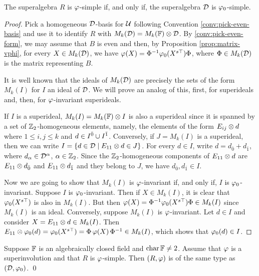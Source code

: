 \begin{prop}\label{prop:vphi-R-simple-D-simple}
	The superalgebra $R$ is $\varphi$-simple if, and only if, the superalgebra $\mathcal{D}$ is $\varphi_0$-simple.
\end{prop}

\begin{proof}
	Pick a homogeneous $\mathcal{D}$-basis for $\mathcal U$ following Convention \ref{conv:pick-even-basis} and use it to identify $R$ with $M_k(\mathcal{D}) = M_k(\mathbb{F}) \otimes \mathcal{D}$.
	By \cref{conv:pick-even-form}, we may assume that $B$ is even and then,
	by Proposition \ref{prop:matrix-vphi}, for every $X \in M_k(\mathcal{D})$, we have
	$\varphi(X) = \Phi^{-1} \varphi_0(X^{s\top}) \Phi$, where $\Phi \in M_k(\mathcal{D})$ is the matrix representing $B$. 

	It is well known that the ideals of $M_k(\mathcal{D})$ are precisely the sets of the form $M_k(I)$ for $I$ an ideal of $\mathcal{D}$.
	We will prove an analog of this, first, for superideals and, then, for $\varphi$-invariant superideals.

	If $I$ is a superideal, $M_k(I) = M_k(\mathbb{F}) \otimes I$ is also a superideal since it is spanned by a set of $\mathbb{Z}_2$-homogeneous elements, namely, the elements of the form $E_{ij}\otimes d$ where $1 \leq i,j \leq k$ and $d \in I^{\bar0} \cup I^{\bar1}$.
	Conversely, if $J = M_k(I)$ is a superideal, then we can write $I = \{ d\in  \mathcal{D} \mid E_{11}\otimes d \in J\}$.
	For every $d\in I$, write $d = d_{\bar 0} + d_{\bar 1}$, where $d_\alpha \in \mathcal{D}^\alpha$, $\alpha \in \mathbb{Z}_2$.
	Since the $\mathbb{Z}_2$-homogeneous components of $E_{11}\otimes d$ are $E_{11}\otimes d_{\bar 0}$ and $E_{11}\otimes d_{\bar 1}$ and they belong to $J$, we have $d_{\bar 0}, d_{\bar 1} \in I$.

	Now we are going to show that $M_k(I)$ is $\varphi$-invariant if, and only if, $I$ is $\varphi_0$-invariant.
	Suppose $I$ is $\varphi_0$-invariant.
	Then if $X \in M_k(I)$, it is clear that $\varphi_0 (X^{s\top})$ is also in $M_k(I)$.
	But then $\varphi(X) = \Phi^{-1} \varphi_0(X^{s\top}) \Phi \in M_k(I)$ since $M_k(I)$ is an ideal.
	Conversely, suppose $M_k(I)$ is $\varphi$-invariant.
	Let $d \in I$ and consider $X = E_{11} \otimes d \in M_k(I)$.
	Then $E_{11} \otimes \varphi_0(d) = \varphi_0(X^{s\top}) = \Phi\, \varphi(X)\, \Phi^{-1} \in M_k(I)$, which shows that $\varphi_0(d) \in I$.
\end{proof}

\begin{cor}\label{cor:D-has-the-same-type}
	Suppose $\mathbb{F}$ is an algebraically closed field and $\operatorname{char} \mathbb{F} \neq 2$.
	Assume that $\varphi$ is a superinvolution and that $R$ is $\varphi$-simple.
	Then $(R, \varphi)$ is of the same type as $(\mathcal{D}, \varphi_0)$. \qed
\end{cor}

